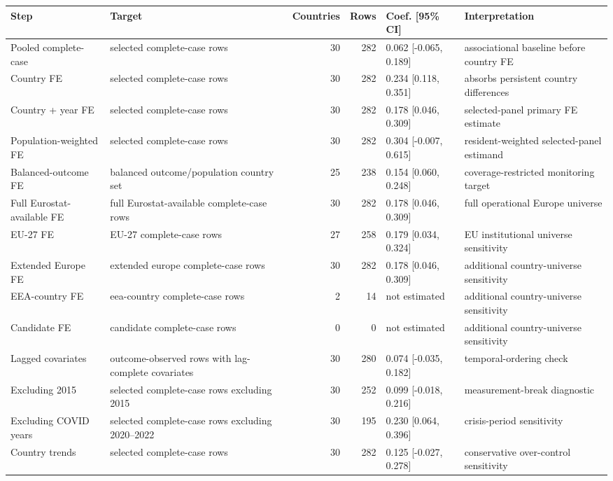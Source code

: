 \begingroup
\setlength{\tabcolsep}{3pt}
\renewcommand{\arraystretch}{1.12}
\begin{tabularx}{\textwidth}{@{}p{}Yrrp{0.18\textwidth}Y@{}}
\toprule
Step & Target & Countries & Rows & Coef. [95\% CI] & Interpretation \\
\midrule
Pooled complete-case & selected complete-case rows & 30 & 282 & 0.062 [-0.065, 0.189] & associational baseline before country FE \\
Country FE & selected complete-case rows & 30 & 282 & 0.234 [0.118, 0.351] & absorbs persistent country differences \\
Country + year FE & selected complete-case rows & 30 & 282 & 0.178 [0.046, 0.309] & selected-panel primary FE estimate \\
Population-weighted FE & selected complete-case rows & 30 & 282 & 0.304 [-0.007, 0.615] & resident-weighted selected-panel estimand \\
Balanced-outcome FE & balanced outcome/population country set & 25 & 238 & 0.154 [0.060, 0.248] & coverage-restricted monitoring target \\
Full Eurostat-available FE & full Eurostat-available complete-case rows & 30 & 282 & 0.178 [0.046, 0.309] & full operational Europe universe \\
EU-27 FE & EU-27 complete-case rows & 27 & 258 & 0.179 [0.034, 0.324] & EU institutional universe sensitivity \\
Extended Europe FE & extended europe complete-case rows & 30 & 282 & 0.178 [0.046, 0.309] & additional country-universe sensitivity \\
EEA-country FE & eea-country complete-case rows & 2 & 14 & not estimated & additional country-universe sensitivity \\
Candidate FE & candidate complete-case rows & 0 & 0 & not estimated & additional country-universe sensitivity \\
Lagged covariates & outcome-observed rows with lag-complete covariates & 30 & 280 & 0.074 [-0.035, 0.182] & temporal-ordering check \\
Excluding 2015 & selected complete-case rows excluding 2015 & 30 & 252 & 0.099 [-0.018, 0.216] & measurement-break diagnostic \\
Excluding COVID years & selected complete-case rows excluding 2020--2022 & 30 & 195 & 0.230 [0.064, 0.396] & crisis-period sensitivity \\
Country trends & selected complete-case rows & 30 & 282 & 0.125 [-0.027, 0.278] & conservative over-control sensitivity \\

\end{tabularx}
